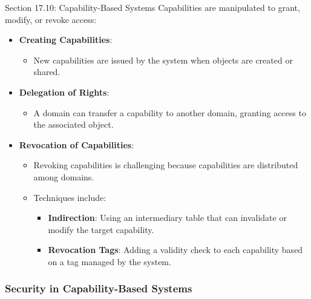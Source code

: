 \begin{notes}{Section 17.10: Capability-Based Systems}
    Capabilities are manipulated to grant, modify, or revoke access:
    \begin{itemize}
        \item \textbf{Creating Capabilities}:
        \begin{itemize}
            \item New capabilities are issued by the system when objects are created or shared.
        \end{itemize}
        \item \textbf{Delegation of Rights}:
        \begin{itemize}
            \item A domain can transfer a capability to another domain, granting access to the associated object.
        \end{itemize}
        \item \textbf{Revocation of Capabilities}:
        \begin{itemize}
            \item Revoking capabilities is challenging because capabilities are distributed among domains.
            \item Techniques include:
            \begin{itemize}
                \item \textbf{Indirection}: Using an intermediary table that can invalidate or modify the target capability.
                \item \textbf{Revocation Tags}: Adding a validity check to each capability based on a tag managed by the system.
            \end{itemize}
        \end{itemize}
    \end{itemize}
    
    \subsubsection*{Security in Capability-Based Systems}
    

\end{notes}
